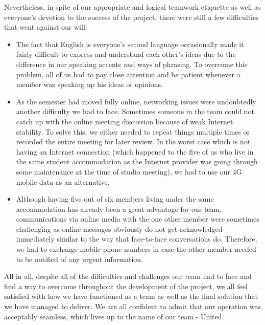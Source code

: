  \par Nevertheless, in spite of our appropriate and logical teamwork etiquette as well as everyone's devotion to the success of the project, there were still a few difficulties that went against our will:
    \begin{itemize}
      \item The fact that English is everyone's second language occasionally made it fairly difficult to express and understand each other's ideas due to the difference in our speaking accents and ways of phrasing. To overcome this problem, all of us had to pay close attention and be patient whenever a member was speaking up his ideas or opinions. 
      \item As the semester had moved fully online, networking issues were undoubtedly another difficulty we had to face. Sometimes someone in the team could not catch up with the online meeting discussion because of weak Internet stability. To solve this, we either needed to repeat things multiple times or recorded the entire meeting for later review. In the worst case which is not having an Internet connection (which happened to the five of us who live in the same student accommodation as the Internet provider was going through some maintenance at the time of studio meeting), we had to use our 4G mobile data as an alternative.
      \item Although having five out of six members living under the same accommodation has already been a great advantage for our team, communications via online media with the one other member were sometimes challenging as online messages obviously do not get acknowledged immediately similar to the way that face-to-face conversations do. Therefore, we had to exchange mobile phone numbers in case the other member needed to be notified of any urgent information.
    \end{itemize}
  \par All in all, despite all of the difficulties and challenges our team had to face and find a way to overcome throughout the development of the project, we all feel satisfied with how we have functioned as a team as well as the final solution that we have managed to deliver. We are all confident to admit that our operation was acceptably seamless, which lives up to the name of our team - United.   
